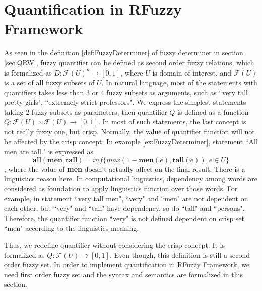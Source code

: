 \section{Quantification in RFuzzy Framework}
\label{sec:QSFQ}
As seen in the definition \ref{def:FuzzyDeterminer} of fuzzy determiner in section \ref{sec:QRW}, fuzzy quantifier can be defined as second order fuzzy relations, which is formalized as $D: \mathcal{F}(U)^n \longrightarrow [0,1]$, where $U$ is domain of interest, and $\mathcal{F}(U)$ is a set of all fuzzy subsets of $U$.
In natural language, most of the statements with quantifiers takes less than $3$ or $4$ fuzzy subsets as arguments,  such as ``very tall pretty girls", ``extremely strict professors".
We express the simplest statements taking $2$ fuzzy subsets as parameters, then quantifier $Q$ is defined as a function $Q: \mathcal{F}(U) \times \mathcal{F}(U) \longrightarrow [0,1]$.
In most of such statements, the last concept is not really fuzzy one, but crisp. Normally, the value of quantifier function will not be affected by the crisp concept. In example \ref{ex:FuzzyDeterminer}, statement ``All men are tall." is expressed as \[\textbf{all}(\textbf{men},\textbf{tall}) = inf\{max(1-\textbf{men}(e), \textbf{tall}(e)), e \in U \}\],  where the value of \textbf{men} doesn't actually affect on the final result. There is a linguistics reason here. In computational linguistics, dependency among words are considered as foundation to apply linguistics function over those words. For example, in statement ``very tall men", ``very" and ``men" are not dependent on each other, but ``very" and ``tall" have dependency, so do ``tall" and ``persons". Therefore, the quantifier function ``very" is not defined dependent on crisp set ``men" according to the linguistics meaning. 

Thus, we redefine quantifier without considering the crisp concept. It is formalized as $Q: \mathcal{F}(U) \longrightarrow [0,1]$. Even though, this definition is still a second order fuzzy set. In order to implement quantification in RFuzzy Framework, we need first order fuzzy set and the syntax and semantics are formalized in this section.



